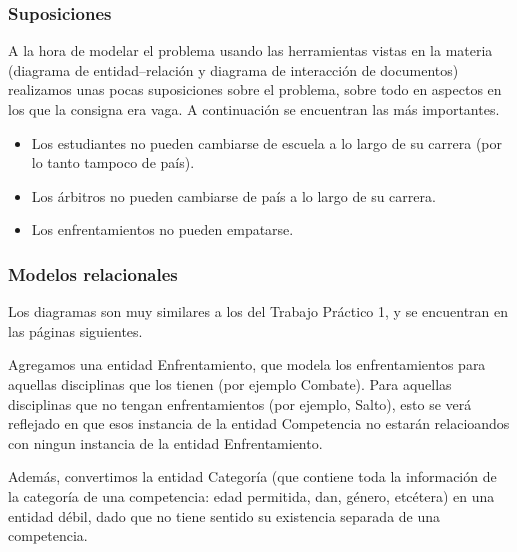 
\subsubsection{Suposiciones}
A la hora de modelar el problema usando las herramientas vistas en la materia (diagrama de entidad--relación y diagrama de interacción de documentos)
realizamos unas pocas suposiciones sobre el problema, sobre todo en aspectos en los que la consigna era vaga. A continuación se encuentran las más importantes.

\begin{itemize}
\item Los estudiantes no pueden cambiarse de escuela a lo largo de su carrera (por lo tanto tampoco de país).
\item Los árbitros no pueden cambiarse de país a lo largo de su carrera.
\item Los enfrentamientos no pueden empatarse.
\end{itemize}

\subsubsection{Modelos relacionales}
Los diagramas son muy similares a los del Trabajo Práctico 1, y se encuentran en las páginas siguientes.

Agregamos una entidad Enfrentamiento, que modela los enfrentamientos para aquellas disciplinas que los tienen (por ejemplo Combate). Para aquellas disciplinas que no tengan enfrentamientos (por ejemplo, Salto), esto se verá reflejado en que esos instancia de la entidad Competencia no estarán relacioandos con ningun instancia de la entidad Enfrentamiento.

Además, convertimos la entidad Categoría (que contiene toda la información de la categoría de una competencia: edad permitida, dan, género, etcétera) en una entidad débil, dado que no tiene sentido su existencia separada de una competencia.

\newpage

